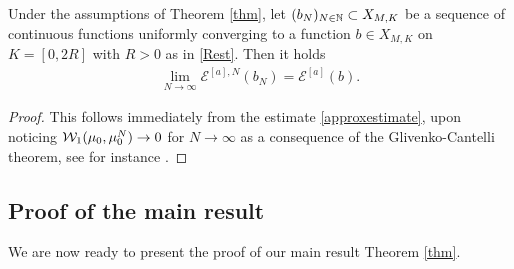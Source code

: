 \begin{lemma}\label{lemma-semicontinuous-1}
	Under the assumptions of Theorem \ref{thm}, let $(b_N)_{N \in \mathbb{N}}\subset X_{M,K}$ be a sequence of continuous functions
	uniformly converging to a function $b \in X_{M,K}$ on $K=[0,2R]$  with $R>0$ as in \eqref{Rest}.
	Then it holds
	\begin{align*}
		\lim_{N\rightarrow\infty} \mathcal E^{[a],N}(b_{N})= \mathcal E^{[a]}(b).
	\end{align*}
\end{lemma}

\begin{proof}
	This follows immediately from the estimate \eqref{approxestimate}, upon noticing
	$\mathcal{W}_1(\mu_0,\mu^N_0) \rightarrow 0$ for $N \rightarrow \infty$ as a consequence of the Glivenko-Cantelli theorem,
see for instance \cite[Lemma 3.3]{fornahuetter}.
\end{proof}

\subsection{Proof of the main result}

We are now ready to present the proof of our main result Theorem \ref{thm}.


